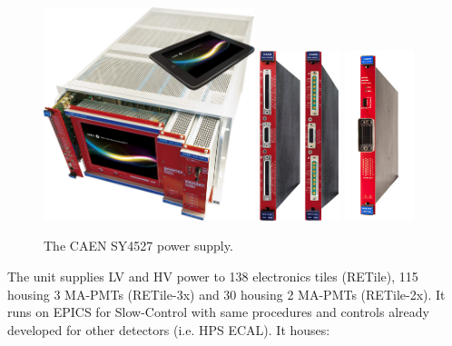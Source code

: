 \documentclass[12pt]{article}
\begin{document}
\begin{figure}[htbp]
\center
\includegraphics[width=0.55\textwidth]{pics/SY4527_modular.jpg}
\vspace*{0.3cm}
\includegraphics[width=0.21\textwidth]{pics/A2518_1-2.jpg}
\includegraphics[width=0.18\textwidth]{pics/A7030-panel6.jpg}
\caption{ \label{Fig:SY4527} The CAEN SY4527 power supply.}
\end{figure}

The unit supplies LV and HV power to 138 electronics tiles (RETile), 115 housing 3 MA-PMTs (RETile-3x) 
and 30 housing 2 MA-PMTs (RETile-2x). It runs on EPICS for Slow-Control with same procedures and controls 
already developed for other detectors (i.e. HPS ECAL). It houses:
\end{document}
